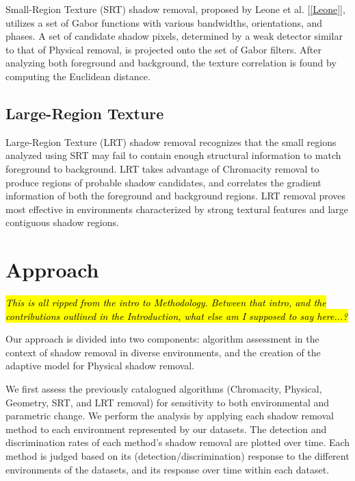 Small-Region Texture (SRT) shadow removal, proposed by Leone et al. [\ref{Leone}], utilizes a set of Gabor functions with various bandwidths, orientations, and phases. A set of candidate shadow pixels, determined by a weak detector similar to that of Physical removal, is projected onto the set of Gabor filters. After analyzing both foreground and background, the texture correlation is found by computing the Euclidean distance.

\subsection{Large-Region Texture}

Large-Region Texture (LRT) shadow removal recognizes that the small regions analyzed using SRT may fail to contain enough structural information to match foreground to background. LRT takes advantage of Chromacity removal to produce regions of probable shadow candidates, and correlates the gradient information of both the foreground and background regions. LRT removal proves most effective in environments characterized by strong textural features and large contiguous shadow regions.


\section{Approach}

\hl{\textit{This is all ripped from the intro to Methodology. Between that intro, and the contributions outlined in the Introduction, what else am I supposed to say here...?}}

Our approach is divided into two components: algorithm assessment in the context of shadow removal in diverse environments, and the creation of the adaptive model for Physical shadow removal.

We first assess the previously catalogued algorithms (Chromacity, Physical, Geometry, SRT, and LRT removal) for sensitivity to both environmental and parametric change. We perform the analysis by applying each shadow removal method to each  environment represented by our datasets. The detection and discrimination rates of each method's shadow removal are plotted over time. Each method is judged based on its (detection/discrimination) response to the different environments of the datasets, and its response over time within each dataset.


